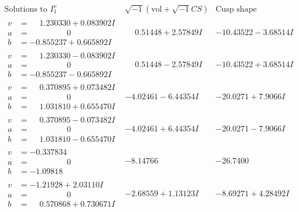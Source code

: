 \documentclass[1p]{elsarticle_modified}
\theoremstyle{definition}
\newcommand{\I}{\sqrt{-1}}
\begin{document}
$$\begin{array}{c|c|c}  
\text{Solutions to }I^v_{1}& \I (\text{vol} + \sqrt{-1}CS) & \text{Cusp shape}\\
 \hline 
\begin{aligned}
v &= \phantom{-}1.230330 + 0.083902 I \\
a &= \phantom{-0.000000 } 0 \\
b &= -0.855237 + 0.665892 I\end{aligned}
 & \phantom{-}0.51448 + 2.57849 I & -10.43522 - 3.68514 I \\ \hline\begin{aligned}
v &= \phantom{-}1.230330 - 0.083902 I \\
a &= \phantom{-0.000000 } 0 \\
b &= -0.855237 - 0.665892 I\end{aligned}
 & \phantom{-}0.51448 - 2.57849 I & -10.43522 + 3.68514 I \\ \hline\begin{aligned}
v &= \phantom{-}0.370895 + 0.073482 I \\
a &= \phantom{-0.000000 } 0 \\
b &= \phantom{-}1.031810 + 0.655470 I\end{aligned}
 & -4.02461 - 6.44354 I & -20.0271 + 7.9066 I \\ \hline\begin{aligned}
v &= \phantom{-}0.370895 - 0.073482 I \\
a &= \phantom{-0.000000 } 0 \\
b &= \phantom{-}1.031810 - 0.655470 I\end{aligned}
 & -4.02461 + 6.44354 I & -20.0271 - 7.9066 I \\ \hline\begin{aligned}
v &= -0.337834\phantom{ +0.000000I} \\
a &= \phantom{-0.000000 } 0 \\
b &= -1.09818\phantom{ +0.000000I}\end{aligned}
 & -8.14766\phantom{ +0.000000I} & -26.7400\phantom{ +0.000000I} \\ \hline\begin{aligned}
v &= -1.21928 + 2.03110 I \\
a &= \phantom{-0.000000 } 0 \\
b &= \phantom{-}0.570868 + 0.730671 I\end{aligned}
 & -2.68559 + 1.13123 I & -8.69271 + 4.28492 I \\ \hline\begin{aligned}

\end{aligned}
\end{array}$$
\end{document}
